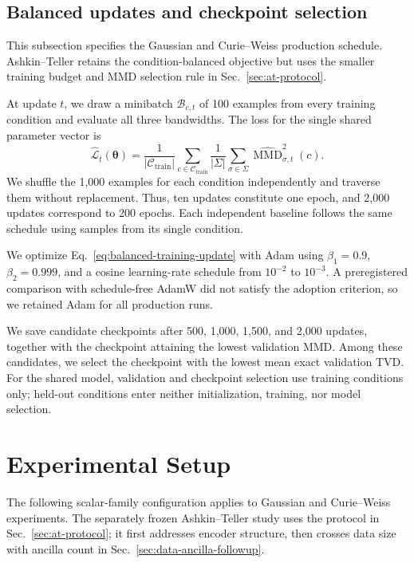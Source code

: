 \documentclass[pra,aps,10pt,twocolumn,floatfix,superscriptaddress,
notitlepage,longbibliography]{revtex4-2}
\newcommand{\mmd}{\operatorname{MMD}}
\begin{document}


\subsection{Balanced updates and checkpoint selection}

This subsection specifies the Gaussian and Curie--Weiss production schedule. Ashkin--Teller retains the condition-balanced objective but uses the smaller training budget and MMD selection rule in Sec.~\ref{sec:at-protocol}.

At update $t$, we draw a minibatch $\mathcal B_{c,t}$ of 100 examples from every training condition and evaluate all three bandwidths. The loss for the single shared parameter vector is
\begin{equation}
    \widehat{\mathcal L}_t(\boldsymbol\theta)
    =\frac{1}{|\mathcal C_{\mathrm{train}}|}
    \sum_{c\in\mathcal C_{\mathrm{train}}}
    \frac{1}{|\Sigma|}
    \sum_{\sigma\in\Sigma}
    \widehat{\mmd}_{\sigma,t}^2(c).
    \label{eq:balanced-training-update}
\end{equation}
We shuffle the 1,000 examples for each condition independently and traverse them without replacement. Thus, ten updates constitute one epoch, and 2,000 updates correspond to 200 epochs. Each independent baseline follows the same schedule using samples from its single condition.

We optimize Eq.~\eqref{eq:balanced-training-update} with Adam using $\beta_1=0.9$, $\beta_2=0.999$, and a cosine learning-rate schedule from $10^{-2}$ to $10^{-3}$. A preregistered comparison with schedule-free AdamW did not satisfy the adoption criterion, so we retained Adam for all production runs.

We save candidate checkpoints after 500, 1,000, 1,500, and 2,000 updates, together with the checkpoint attaining the lowest validation MMD. Among these candidates, we select the checkpoint with the lowest mean exact validation TVD. For the shared model, validation and checkpoint selection use training conditions only; held-out conditions enter neither initialization, training, nor model selection.

\section{Experimental Setup}

The following scalar-family configuration applies to Gaussian and Curie--Weiss experiments. The separately frozen Ashkin--Teller study uses the protocol in Sec.~\ref{sec:at-protocol}; it first addresses encoder structure, then crosses data size with ancilla count in Sec.~\ref{sec:data-ancilla-followup}.
\end{document}
